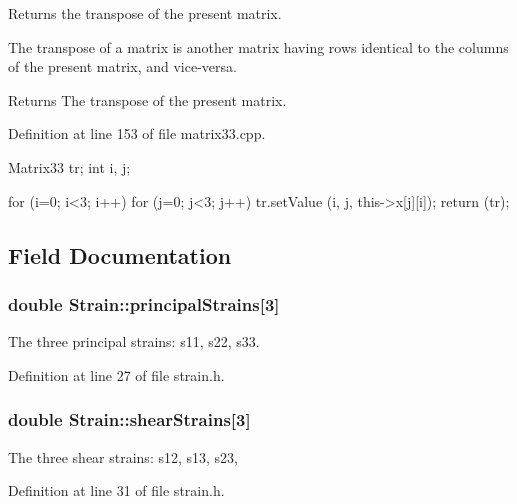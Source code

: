 \-Returns the transpose of the present matrix. 

\-The transpose of a matrix is another matrix having rows identical to the columns of the present matrix, and vice-\/versa. \begin{DoxyReturn}{\-Returns}
\-The transpose of the present matrix. 
\end{DoxyReturn}


\-Definition at line 153 of file matrix33.\-cpp.


\begin{DoxyCode}
{
  Matrix33 tr;
  int i, j;

  for (i=0; i<3; i++)
    {
      for (j=0; j<3; j++)
        {
          tr.setValue (i, j, this->x[j][i]);
        }
    }
  return (tr);
}
\end{DoxyCode}


\subsection{\-Field \-Documentation}
\hypertarget{classStrain_a172c6ef4593e35bc9280a2dafde61475}{
\subsubsection[{principal\-Strains}]{\setlength{\rightskip}{0pt plus 5cm}double {\bf \-Strain\-::principal\-Strains}\mbox{[}3\mbox{]}}}\label{d1/d3c/classStrain_a172c6ef4593e35bc9280a2dafde61475}
\-The three principal strains\-: s11, s22, s33. 

\-Definition at line 27 of file strain.\-h.

\hypertarget{classStrain_afbc4d1b573860bda614a43f767b8b272}{
\subsubsection[{shear\-Strains}]{\setlength{\rightskip}{0pt plus 5cm}double {\bf \-Strain\-::shear\-Strains}\mbox{[}3\mbox{]}}}\label{d1/d3c/classStrain_afbc4d1b573860bda614a43f767b8b272}
\-The three shear strains\-: s12, s13, s23, 

\-Definition at line 31 of file strain.\-h.


